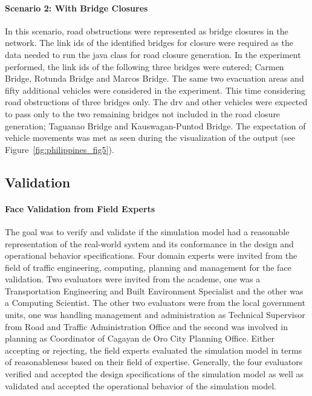 \paragraph{Scenario 2: With Bridge Closures}
In this scenario, road obstructions were represented as bridge closures in the network. The link ids of the identified bridges for closure were required as the data needed to run the java class for road closure generation. In the experiment performed, the link ids of the following three bridges were entered; Carmen Bridge, Rotunda Bridge and Marcos Bridge. The same two evacuation areas and fifty additional vehicles were considered in the experiment. This time considering road obstructions of three bridges only. The \gls{drv} and other vehicles were expected to pass only to the two remaining bridges not included in the road closure generation; Taguanao Bridge and Kauswagan-Puntod Bridge. The expectation of vehicle movements was met as seen during the visualization of the output (see Figure~\ref{fig:philippines_fig5}). 

\subsection{Validation} 
\paragraph{Face Validation from Field Experts}
The goal was to verify and validate if the simulation model had a reasonable representation of the real-world system and its conformance in the design and operational behavior specifications. Four domain experts were invited from the field of traffic engineering, computing, planning and management for the face validation. Two evaluators were invited from the academe, one was a Transportation Engineering and Built Environment Specialist and the other was a Computing Scientist. The other two evaluators were from the local government units, one was handling management and administration as Technical Supervisor from Road and Traffic Administration Office and the second was involved in planning as Coordinator of Cagayan de Oro City Planning Office. Either accepting or rejecting, the field experts evaluated the simulation model in terms of reasonableness based on their field of expertise. Generally, the four evaluators verified and accepted the design specifications of the simulation model as well as validated and accepted the operational behavior of the simulation model.

